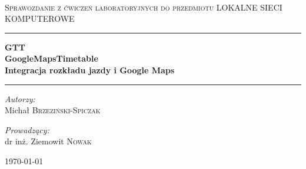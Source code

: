 \documentclass[a4paper,12pt]{article}
\begin{document}
\pagestyle{plain}

\begin{titlepage}
 


 
\\[1cm] 
 \begin{center}
 
\textsc{ Sprawozdanie z ćwiczeń laboratoryjnych do przedmiotu LOKALNE
SIECI KOMPUTEROWE}\\[1.5cm]
 
 
 \hrule height 1pt
  \par
  \vfil \vskip 0.5cm
   
{ \large \bfseries GTT\\
GoogleMapsTimetable\\
Integracja rozkładu jazdy i Google Maps}\\[0.8cm]
 
  \hrule height 1pt
  \par
  \vfil \vskip 3.5cm

\begin{minipage}{0.55\textwidth}
\begin{flushleft} \large
\emph{Autorzy:}\\
Michał \textsc{Brzeziński-Spiczak}\\
\end{flushleft}
\end{minipage}
\begin{minipage}{0.4\textwidth}
\begin{flushright} \large
\emph{Prowadzący:} \\
dr inż. Ziemowit \textsc{Nowak}
\end{flushright}
\end{minipage}
 
\vfill
 
{\large \today}
 
\end{center}
 
\end{titlepage}
\newpage
\tableofcontents
\newpage
\end{document}
